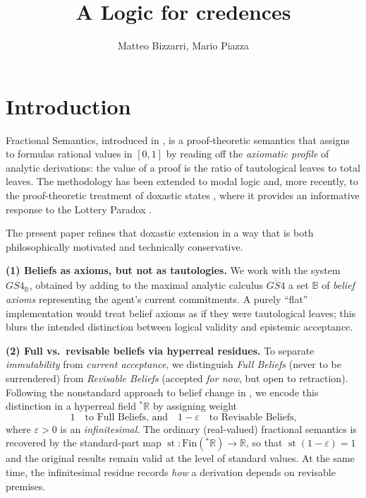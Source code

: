 \documentclass[12pt,a4paper,reqno]{amsart}
\title{A Logic for credences}
\author{Matteo Bizzarri, Mario Piazza}
\theoremstyle{definition}
\newcommand{\numberset}{\mathbb}
\newcommand{\R}{\numberset{R}}
\newcommand{\B}{\numberset{B}}
\DeclareMathOperator{\st}{st}
\newcommand{\Rstar}{{}^{\ast}\R}
\newcommand{\Fin}{\mathrm{Fin}}
\begin{document}
\maketitle

\section{Introduction}

Fractional Semantics, introduced in \cite{piazzapulcini:fractional}, is a proof-theoretic semantics that assigns to formulas rational values in $[0,1]$ by reading off the \emph{axiomatic profile} of analytic derivations: the value of a proof is the ratio of tautological leaves to total leaves.  The methodology has been extended to modal logic \cite{piazzapulcini:modal} and, more recently, to the proof-theoretic treatment of doxastic states \cite{bizzarri_beliefs}, where it provides an informative response to the Lottery Paradox \cite{bizzarri_lottery}.

The present paper refines that doxastic extension in a way that is both philosophically motivated and technically conservative.

\smallskip
\noindent\textbf{(1) Beliefs as axioms, but not as tautologies.}
We work with the system $GS4_\B$, obtained by adding to the maximal analytic calculus $\overline{\overline{GS4}}$ a set $\B$ of \emph{belief axioms} representing the agent's current commitments.  A purely ``flat'' implementation would treat belief axioms as if they were tautological leaves; this blurs the intended distinction between logical validity and epistemic acceptance.

\smallskip
\noindent\textbf{(2) Full vs.\ revisable beliefs via hyperreal residues.}
To separate \emph{immutability} from \emph{current acceptance}, we distinguish \emph{Full Beliefs} (never to be surrendered) from \emph{Revisable Beliefs} (accepted \emph{for now}, but open to retraction).  Following the nonstandard approach to belief change in \cite{Hansson2020}, we encode this distinction in a hyperreal field $\Rstar$ by assigning weight
\[
1 \quad\text{to Full Beliefs, and}\quad 1-\varepsilon \quad\text{to Revisable Beliefs,}
\]
where $\varepsilon>0$ is an \emph{infinitesimal}.  The ordinary (real-valued) fractional semantics is recovered by the standard-part map $\st:\Fin(\Rstar)\to\R$, so that $\st(1-\varepsilon)=1$ and the original results remain valid at the level of standard values.  At the same time, the infinitesimal residue records \emph{how} a derivation depends on revisable premises.
\end{document}
